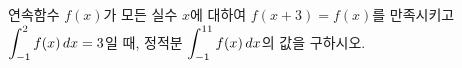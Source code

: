 연속함수 $f(x)$가 모든 실수 $x$에 대하여 $f(x+3)=f(x)$를 만족시키고 $\displaystyle\int_{-1}^{2}f(x)\mkern3mu dx=3$일 때, 정적분 $\displaystyle\int_{-1}^{11}f(x)\mkern3mu dx$의 값을 구하시오.
